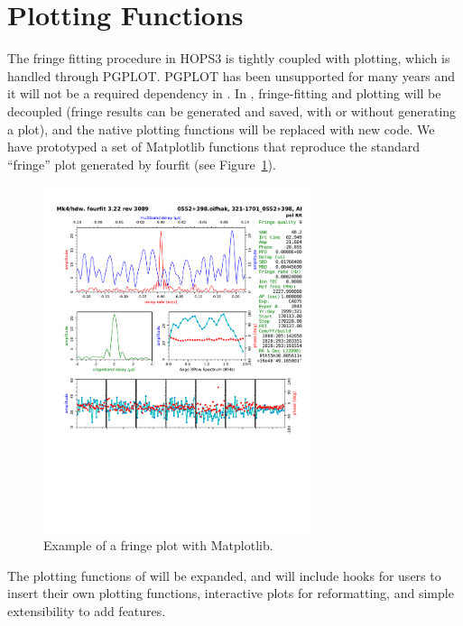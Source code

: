 
\section{Plotting Functions}
\label{sec:plotting}

The fringe fitting procedure in HOPS3 is tightly coupled with plotting, which is handled through PGPLOT. PGPLOT has been unsupported for many years and it will not be a required dependency in \nuHOPS. In \nuHOPS, fringe-fitting and plotting will be decoupled (fringe results can be generated and saved, with or without generating a plot), and the native plotting functions will be replaced with new code. We have prototyped a set of Matplotlib functions that reproduce the standard ``fringe'' plot generated by fourfit (see Figure~\ref{fig:matplotlib-fringe-plot}).

\begin{figure}[h!]
  \begin{center}
    \captionsetup{width=0.6\linewidth}
    \includegraphics[width=0.7\textwidth]{matplotlib-fringe-plot.pdf}
    \caption{Example of a fringe plot with Matplotlib.}
    \label{fig:matplotlib-fringe-plot}
\end{center}
\end{figure}


The plotting functions of \nuHOPS will be expanded, and will include hooks for users to insert their own plotting functions, interactive plots for reformatting, and simple extensibility to add features.
